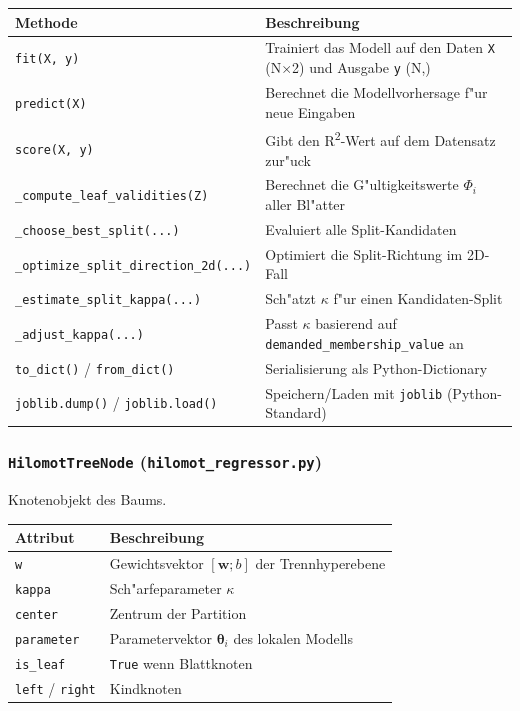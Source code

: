 \documentclass[12pt,a4paper]{article}
\begin{document}
\begin{center}
\begin{tabular}{p{5.5cm}p{7.5cm}}
  \toprule
  \textbf{Methode} & \textbf{Beschreibung} \\
  \midrule
  \texttt{fit(X, y)} & Trainiert das Modell auf den Daten \texttt{X} (N$\times$2) und Ausgabe \texttt{y} (N,) \\
  \texttt{predict(X)} & Berechnet die Modellvorhersage f"ur neue Eingaben \\
  \texttt{score(X, y)} & Gibt den R\textsuperscript{2}-Wert auf dem Datensatz zur"uck \\
  \texttt{\_compute\_leaf\_validities(Z)} & Berechnet die G"ultigkeitswerte $\Phi_i$ aller Bl"atter \\
  \texttt{\_choose\_best\_split(...)} & Evaluiert alle Split-Kandidaten \\
  \texttt{\_optimize\_split\_direction\_2d(...)} & Optimiert die Split-Richtung im 2D-Fall \\
  \texttt{\_estimate\_split\_kappa(...)} & Sch"atzt $\kappa$ f"ur einen Kandidaten-Split \\
  \texttt{\_adjust\_kappa(...)} & Passt $\kappa$ basierend auf \texttt{demanded\_membership\_value} an \\
  \texttt{to\_dict()} / \texttt{from\_dict()} & Serialisierung als Python-Dictionary \\
  \texttt{joblib.dump()} / \texttt{joblib.load()} & Speichern/Laden mit \texttt{joblib} (Python-Standard) \\
  \bottomrule
\end{tabular}
\end{center}

\subsubsection*{\texttt{HilomotTreeNode} (\texttt{hilomot\_regressor.py})}

Knotenobjekt des Baums.

\begin{center}
\begin{tabular}{p{3.5cm}p{9cm}}
  \toprule
  \textbf{Attribut} & \textbf{Beschreibung} \\
  \midrule
  \texttt{w} & Gewichtsvektor $[\mathbf{w}; b]$ der Trennhyperebene \\
  \texttt{kappa} & Sch"arfeparameter $\kappa$ \\
  \texttt{center} & Zentrum der Partition \\
  \texttt{parameter} & Parametervektor $\boldsymbol{\theta}_i$ des lokalen Modells \\
  \texttt{is\_leaf} & \texttt{True} wenn Blattknoten \\
  \texttt{left} / \texttt{right} & Kindknoten \\
  \bottomrule
\end{tabular}
\end{center}
\end{document}
